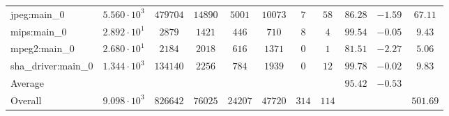 \begin{tabular}{|l|c|c|c|c|c|c|c|c|c|c|}
jpeg:main\_0            & $ 5.560 \cdot 10^{3} $ & $ 479704 $ & $ 14890 $ & $ 5001  $ & $ 10073 $ & $ 7   $ & $ 58  $ & $ 86.28       $ & $ -1.59   $ & $ 67.11   $ \\
mips:main\_0            & $ 2.892 \cdot 10^{1} $ & $ 2879   $ & $ 1421  $ & $ 446   $ & $ 710   $ & $ 8   $ & $ 4   $ & $ 99.54       $ & $ -0.05   $ & $ 9.43    $ \\
mpeg2:main\_0           & $ 2.680 \cdot 10^{1} $ & $ 2184   $ & $ 2018  $ & $ 616   $ & $ 1371  $ & $ 0   $ & $ 1   $ & $ 81.51       $ & $ -2.27   $ & $ 5.06    $ \\
sha\_driver:main\_0     & $ 1.344 \cdot 10^{3} $ & $ 134140 $ & $ 2256  $ & $ 784   $ & $ 1939  $ & $ 0   $ & $ 12  $ & $ 99.78       $ & $ -0.02   $ & $ 9.83    $ \\
\hline
Average                 & $                    $ & $        $ & $       $ & $       $ & $       $ & $     $ & $     $ & $ 95.42       $ & $ -0.53   $ & $         $ \\
\hline
Overall                 & $ 9.098 \cdot 10^{3} $ & $ 826642 $ & $ 76025 $ & $ 24207 $ & $ 47720 $ & $ 314 $ & $ 114 $ & $             $ & $         $ & $ 501.69  $ \\
\hline
\end{tabular}
